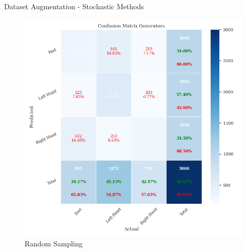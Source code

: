 \begin{frame}{Dataset Augmentation - Stochastic Methods}
\begin{minipage}{0.49\textwidth}
\begin{figure}[htpb!]
            \includegraphics[width=\textwidth]{figures/augmentation/stochastic/confusion_matrix_generators_2024_03_30_18_01_19_random_sampler_using_LSTMNet_0.5943600867678959.pkl.png}
            \caption{Random Sampling}
        \end{figure}
    \end{minipage}
\end{frame}

